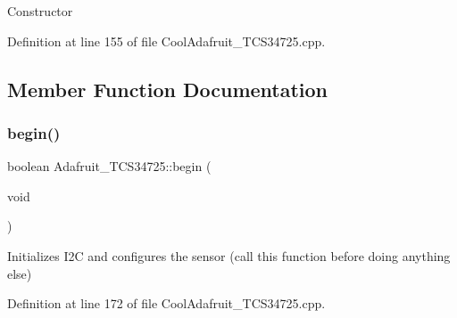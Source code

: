 Constructor 

Definition at line 155 of file Cool\+Adafruit\+\_\+\+T\+C\+S34725.\+cpp.



\subsection{Member Function Documentation}
\mbox{\label{class_adafruit___t_c_s34725_a568d79b6382ac27010a8afc26cbdae79}} 
\subsubsection{\texorpdfstring{begin()}{begin()}}
{\footnotesize\ttfamily boolean Adafruit\+\_\+\+T\+C\+S34725\+::begin (\begin{DoxyParamCaption}\item[{void}]{ }\end{DoxyParamCaption})}

Initializes I2C and configures the sensor (call this function before doing anything else) 

Definition at line 172 of file Cool\+Adafruit\+\_\+\+T\+C\+S34725.\+cpp.

